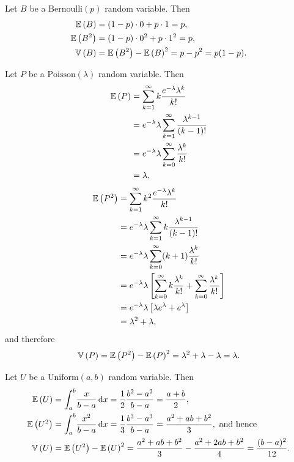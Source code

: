 \begin{ex}
  Let $B$ be a $\text{Bernoulli}(p)$ random variable. Then
  \begin{align*}
    \mathbb{E}\left(B\right)   & =(1-p)\cdot 0 + p\cdot 1 = p,     \\
    \mathbb{E}\left(B^2\right) & =(1-p)\cdot 0^2 + p\cdot 1^2 = p, \\
    \mathbb{V}\left(B\right) & = \mathbb{E}\left(B^2\right)-\mathbb{E}\left(B\right)^2=p-p^2=p(1-p).
  \end{align*}

  Let $P$ be a $\text{Poisson}(\lambda)$ random variable. Then
  \begin{align*}
    \mathbb{E}\left(P\right)
     & =\sum_{k=1}^\infty k\frac{e^{-\lambda}\lambda^{k}}{k!}              \\
     & =e^{-\lambda}\lambda \sum_{k=1}^\infty \frac{\lambda^{k-1}}{(k-1)!} \\
     & =e^{-\lambda}\lambda \sum_{k=0}^\infty \frac{\lambda^{k}}{k!}       \\
     & = \lambda,
  \end{align*}
  \begin{align*}
    \mathbb{E}\left(P^2\right)
     & =\sum_{k=1}^\infty k^2\frac{e^{-\lambda}\lambda^{k}}{k!}                                                        \\
     & =e^{-\lambda}\lambda\sum_{k=1}^\infty k\frac{\lambda^{k-1}}{(k-1)!}                                             \\
     & =e^{-\lambda}\lambda\sum_{k=0}^\infty (k+1)\frac{\lambda^k}{k!}                                                 \\
     & =e^{-\lambda}\lambda\left[\sum_{k=0}^\infty k\frac{\lambda^k}{k!}+\sum_{k=0}^\infty \frac{\lambda^k}{k!}\right] \\
     & =e^{-\lambda}\lambda\left[\lambda e^{\lambda} + e^{\lambda}\right]                                              \\
     & =\lambda^2+\lambda,
  \end{align*}
  and therefore
  \[
    \mathbb{V}\left(P\right)
    =\mathbb{E}\left(P^2\right)-\mathbb{E}\left(P\right)^2
    =\lambda^2+\lambda-\lambda=\lambda.
  \]

  Let $U$ be a $\text{Uniform}(a, b)$ random variable. Then
  \begin{align*}
    \mathbb{E}\left(U\right)   & = \int_a^b\!\frac{x}{b - a}\,\mathrm{d}{x}
    =\frac{1}{2}\frac{b^2-a^2}{b-a}
    =\frac{a + b}{2},                              \\
    \mathbb{E}\left(U^2\right) & = \int_a^b\!\frac{x^2}{b - a}\,\mathrm{d}{x}
    =\frac{1}{3}\frac{b^3-a^3}{b-a}
    =\frac{a^2+ab+b^2}{3},\text{ and hence}        \\
    \mathbb{V}\left(U\right) & = \mathbb{E}\left(U^2\right)-\mathbb{E}\left(U\right)^2
    =\frac{a^2+ab+b^2}{3}-\frac{a^2+2ab+b^2}{4}
    =\frac{(b-a)^2}{12}.
  \end{align*}


\end{ex}
